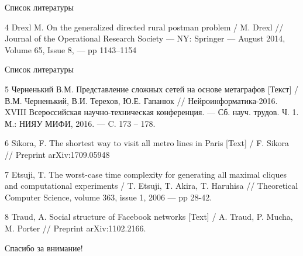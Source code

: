 \documentclass{beamer}
\begin{document}
\begin{darkframes}
\begin{frame}[label=bibliography]{Список литературы}
\begin{thebibliography}{9}
{					\item[4] Drexl M. On the generalized directed rural postman problem / M. Drexl // Journal of the Operational Research Society --- NY: Springer --- August 2014, Volume 65, Issue 8, --- pp 1143–1154


				}
			\end{thebibliography}
		\end{frame}

		\begin{frame}[label=bibliography]{Список литературы}
			\begin{thebibliography}{9}
					\justifying
				\small{
					\item[5] Черненький В.М. Представление сложных сетей на основе метаграфов [Текст] / В.М. Черненький, В.И. Терехов, Ю.Е. Гапанюк // Нейроинформатика-2016. XVIII Всероссийская научно-техническая конференция. --- Сб. науч. трудов. Ч. 1. М.: НИЯУ МИФИ, 2016. --- C. 173 – 178.
					\item[6] Sikora, F. The shortest way to visit all metro lines in Paris [Text] / F. Sikora // Preprint arXiv:1709.05948
					\item[7] Etsuji, T. The worst-case time complexity for generating all maximal cliques and computational experiments / T. Etsuji, T. Akira, T. Haruhisa // Theoretical Computer Science, volume 363, issue 1, 2006 --- pp 28-42.
					\item[8] Traud, A. Social structure of Facebook networks [Text] / A. Traud, P. Mucha, M. Porter // Preprint arXiv:1102.2166.

				}
			\end{thebibliography}
		\end{frame}
		
		\begin{frame}[label=bibliography]{}
			\begin{thebibliography}{9}
					\centering
					\LARGE{Спасибо за внимание!}
			\end{thebibliography}
		\end{frame}

	\end{darkframes}
\end{document}
